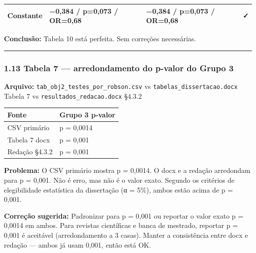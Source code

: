 \documentclass[
]{article}
\begin{document}
\begin{longtable}[]{@{}llll@{}}
\begin{minipage}[t]{0.22\columnwidth}\raggedright
Constante\strut
\end{minipage} & \begin{minipage}[t]{0.22\columnwidth}\raggedright
−0,384 / p=0,073 / OR=0,68\strut
\end{minipage} & \begin{minipage}[t]{0.22\columnwidth}\raggedright
−0,384 / p=0,073 / OR=0,68\strut
\end{minipage} & \begin{minipage}[t]{0.22\columnwidth}\raggedright
✓\strut
\end{minipage}\tabularnewline
\bottomrule
\end{longtable}

\textbf{Conclusão:} Tabela 10 está perfeita. Sem correções necessárias.

\begin{center}\rule{0.5\linewidth}{0.5pt}\end{center}

\hypertarget{tabela-7-arredondamento-do-p-valor-do-grupo-3}{%
\subsubsection{1.13 Tabela 7 --- arredondamento do p-valor do Grupo
3}\label{tabela-7-arredondamento-do-p-valor-do-grupo-3}}

\textbf{Arquivo:} \texttt{tab\_obj2\_testes\_por\_robson.csv} vs
\texttt{tabelas\_dissertacao.docx} Tabela 7 vs
\texttt{resultados\_redacao.docx} §4.3.2

\begin{longtable}[]{@{}ll@{}}
\toprule
Fonte & Grupo 3 p-valor\tabularnewline
\midrule
\endhead
CSV primário & p = 0,0014\tabularnewline
Tabela 7 docx & p = 0,001\tabularnewline
Redação §4.3.2 & p = 0,001\tabularnewline
\bottomrule
\end{longtable}

\textbf{Problema:} O CSV primário mostra p = 0,0014. O docx e a redação
arredondam para p = 0,001. Não é erro, mas não é o valor exato. Segundo
os critérios de elegibilidade estatística da dissertação (α = 5\%),
ambos estão acima de p = 0,001.

\textbf{Correção sugerida:} Padronizar para p = 0,001 ou reportar o
valor exato p = 0,0014 em ambos. Para revistas científicas e banca de
mestrado, reportar p = 0,001 é aceitável (arredondamento a 3 casas).
Manter a consistência entre docx e redação --- ambos já usam 0,001,
então está OK.
\end{document}
